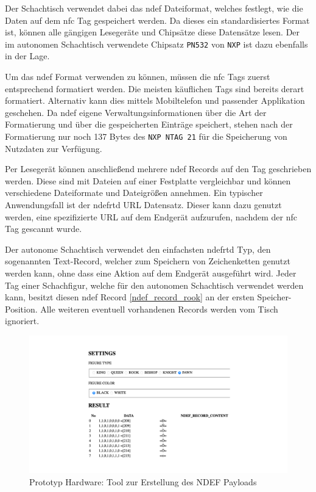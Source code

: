 Der Schachtisch verwendet dabei das \gls{ndef} Dateiformat, welches
festlegt, wie die Daten auf dem \gls{nfc} Tag gespeichert werden. Da
dieses ein standardisiertes Format ist, können alle gängigen Lesegeräte
und Chipsätze diese Datensätze lesen. Der im autonomen Schachtisch
verwendete Chipsatz \passthrough{\lstinline!PN532!} von
\passthrough{\lstinline!NXP!} ist dazu ebenfalls in der Lage.

Um das \gls{ndef} Format verwenden zu können, müssen die \gls{nfc} Tags
zuerst entsprechend formatiert werden. Die meisten käuflichen Tags sind
bereits derart formatiert. Alternativ kann dies mittels Mobiltelefon und
passender Applikation geschehen. Da \gls{ndef} eigene
Verwaltungsinformationen über die Art der Formatierung und über die
gespeicherten Einträge speichert, stehen nach der Formatierung nur noch
137 Bytes des \passthrough{\lstinline!NXP NTAG 21!} für die Speicherung
von Nutzdaten zur Verfügung.

Per Lesegerät können anschließend mehrere \gls{ndef} Records auf den Tag
geschrieben werden. Diese sind mit Dateien auf einer Festplatte
vergleichbar und können verschiedene Dateiformate und Dateigrößen
annehmen. Ein typischer Anwendungsfall ist der \gls{ndefrtd} URL
Datensatz. Dieser kann dazu genutzt werden, eine spezifizierte URL auf
dem Endgerät aufzurufen, nachdem der \gls{nfc} Tag gescannt
wurde.\cite{nordicnfclibndef}

Der autonome Schachtisch verwendet den einfachsten \gls{ndefrtd} Typ,
den sogenannten Text-Record, welcher zum Speichern von Zeichenketten
genutzt werden kann, ohne dass eine Aktion auf dem Endgerät ausgeführt
wird. Jeder Tag einer Schachfigur, welche für den autonomen Schachtisch
verwendet werden kann, besitzt diesen \gls{ndef} Record
\ref{ndef_record_rook} an der ersten Speicher-Position. Alle weiteren
eventuell vorhandenen Records werden vom Tisch
ignoriert.\cite{nordicnfclib}

\begin{figure}
\centering
\includegraphics{images/ATC_ChessFigureIDGenerator.png}
\caption{Prototyp Hardware: Tool zur Erstellung des NDEF
Payloads\label{ATC_ChessFigureIDGenerator}}
\end{figure}

